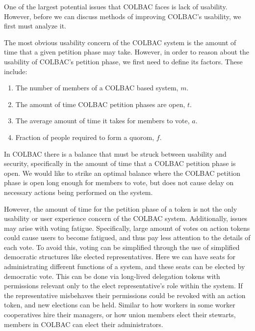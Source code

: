 One of the largest potential issues that COLBAC faces is lack of usability.
However, before we can discuss methods of improving COLBAC's usability, we first
must analyze it. 

The most obvious usability concern of the COLBAC system is the amount of time
that a given petition phase may take. However, in order to reason about the
usability of COLBAC's petition phase, we first need to define its factors. These
include:
\begin{enumerate}
\item The number of members of a COLBAC based system, $m$.
\item The amount of time COLBAC petition phases are open, $t$.
\item The average amount of time it takes for members to vote, $a$.
\item Fraction of people required to form a quorom, $f$.
\end{enumerate}


In COLBAC there is a balance that must be struck between usability and security,
specifically in the amount of time that a COLBAC petition phase is open. We
would like to strike an optimal balance where the COLBAC petition phase is open
long enough for members to vote, but does not cause delay on necessary actions
being performed on the system.

However, the amount of time for the petition phase of a token is not the only
usability or user experience concern of the COLBAC system. Additionally, issues
may arise with voting fatigue. Specifically, large amount of votes on action
tokens could cause users to become fatigued, and thus pay less attention to the
details of each vote. To avoid this, voting can be simplified through the use of
simplified democratic structures like elected representatives. Here we can have
seats for administrating different functions of a system, and these seats can be
elected by democratic vote. This can be done via long-lived delegation tokens
with permissions relevant only to the elect representative's role within the
system. If the representative misbehaves their permissions could be revoked with
an action token, and new elections can be held. Similar to how workers in some
worker cooperatives hire their managers, or how union members elect their
stewarts, members in COLBAC can elect their administrators.

